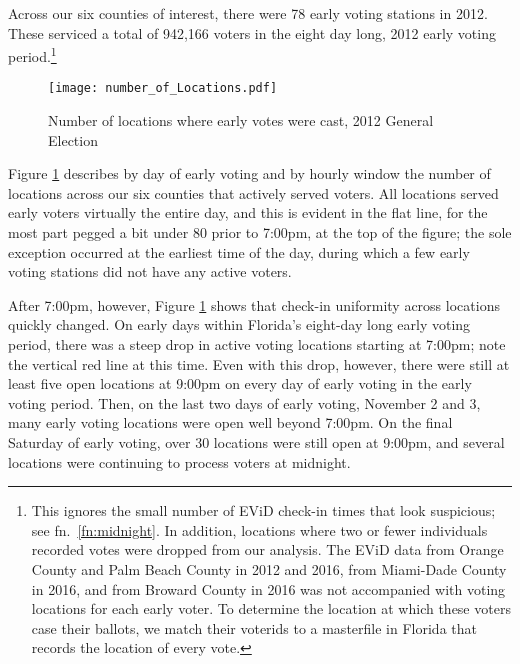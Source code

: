 \documentclass[12pt,titlepage]{article}
\begin{document}
Across our six counties of interest, there were 78 early voting
stations in 2012.  These serviced a total of 942,166 voters in the
eight day long, 2012 early voting period.\footnote{This ignores the
  small number of EViD check-in times that look suspicious; see fn.\
  \ref{fn:midnight}.  In addition, locations where two or fewer
  individuals recorded votes were dropped from our analysis.  The EViD
  data from Orange County and Palm Beach County in 2012 and 2016, from
  Miami-Dade County in 2016, and from Broward County in 2016 was not
  accompanied with voting locations for each early voter.  To
  determine the location at which these voters case their ballots, we
  match their voterids to a masterfile in Florida that records the
  location of every vote.}  %



\begin{figure}[!ht]
  \caption{Number of locations where early votes were cast, 2012
    General Election}
  \label{fig:nrlocs2012}
  \centering
    \centering\texttt{[image: number\_of\_Locations.pdf]}
\end{figure}

Figure \ref{fig:nrlocs2012} describes by day of early voting and by
hourly window the number of locations across our six counties that
actively served voters.  All locations served early voters virtually
the entire day, and this is evident in the flat line, for the most
part pegged a bit under 80 prior to 7:00pm, at the top of the figure;
the sole exception occurred at the earliest time of the day, during
which a few early voting stations did not have any active voters.

After 7:00pm, however, Figure \ref{fig:nrlocs2012} shows that check-in
uniformity across locations quickly changed.  On early days within
Florida's eight-day long early voting period, there was a steep drop
in active voting locations starting at 7:00pm; note the vertical red
line at this time.  Even with this drop, however, there were still at
least five open locations at 9:00pm on every day of early voting in
the early voting period.  Then, on the last two days of early voting,
November 2 and 3, many early voting locations were open well beyond
7:00pm.  On the final Saturday of early voting, over 30 locations were
still open at 9:00pm, and several locations were continuing to process
voters at midnight.
\end{document}

